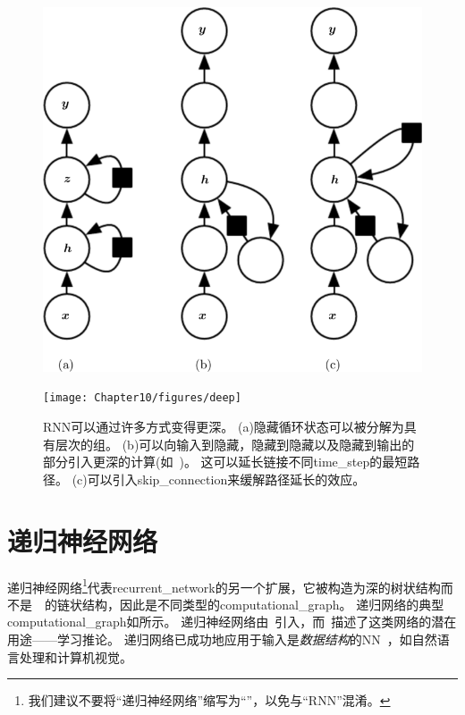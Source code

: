 
\begin{figure}[!htb]
\ifOpenSource
\centerline{\includegraphics[scale=0.5]{images/101.png}}
\else
\centerline{\texttt{[image: Chapter10/figures/deep]}}
\fi
\caption{\gls{RNN}可以通过许多方式变得更深\citep{Pascanu-et-al-ICLR2014}。
(a)隐藏循环状态可以被分解为具有层次的组。
(b)可以向输入到隐藏，隐藏到隐藏以及隐藏到输出的部分引入更深的计算(如~)。
这可以延长链接不同\gls{time_step}的最短路径。
(c)可以引入\gls{skip_connection}来缓解路径延长的效应。
}
\label{fig:chap10_deep}
\end{figure}

\section{递归神经网络}
\label{sec:recursive_neural_networks}
递归神经网络\footnote{我们建议不要将``递归神经网络''缩写为``''，以免与``\gls{RNN}''混淆。}代表\gls{recurrent_network}的另一个扩展，它被构造为深的树状结构而不是~~的链状结构，因此是不同类型的\gls{computational_graph}。
递归网络的典型\gls{computational_graph}如所示。
递归神经网络由~\cite{Pollack90}引入，而~\cite{bottou_machine_2014}描述了这类网络的潜在用途——学习推论。
递归网络已成功地应用于输入是\emph{数据结构}的\gls{NN}~\citep{Frasconi97,Frasconi-1998}，如自然语言处理\citep{Socher+al-NIPS2011,socher_semi-supervised_2011,Socher-et-al-EMNLP2013}和计算机视觉\citep{socher_parsing_2011}。

